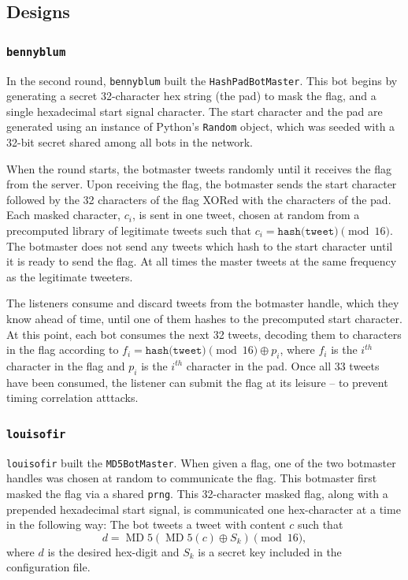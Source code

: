 \documentclass[11pt, oneside]{article} %
\numberwithin{equation}{section} %
\numberwithin{figure}{section} %
\numberwithin{table}{section} %
\renewcommand{\c}[1]{\texttt{#1}}
\newcommand{\teambb}{\c{bennyblum}}
\newcommand{\teamol}{\c{louisofir}}
\DeclareMathOperator{\MD}{MD}
\begin{document}
		
	\subsection{Designs}
		
		\subsubsection{\teambb{}}
        	In the second round, \teambb{} built the \c{HashPadBotMaster}. This bot begins by generating a secret 32-character hex string (the pad) to mask the flag, and a single hexadecimal start signal character. The start character and the pad are generated using an instance of Python's \c{Random} object, which was seeded with a 32-bit secret shared among all bots in the network.
        	
            When the round starts, the botmaster tweets randomly until it receives the flag from the server. Upon receiving the flag, the botmaster sends the start character followed by the 32 characters of the flag XORed with the characters of the pad. Each masked character, $c_i$, is sent in one tweet, chosen at random from a precomputed library of legitimate tweets such that $c_i = \c{hash(tweet)} \pmod{16}$. The botmaster does not send any tweets which hash to the start character until it is ready to send the flag. At all times the master tweets at the same frequency as the legitimate tweeters.
        	
            The listeners consume and discard tweets from the botmaster handle, which they know ahead of time, until one of them hashes to the precomputed start character. At this point, each bot consumes the next 32 tweets, decoding them to characters in the flag according to $f_i = \c{hash(tweet)} \pmod{16} \oplus p_i$, where $f_i$ is the $i^{th}$ character in the flag and $p_i$ is the $i^{th}$ character in the pad. Once all 33 tweets have been consumed, the listener can submit the flag at its leisure -- to prevent timing correlation atttacks.
		
        \subsubsection{\teamol{}}
			\teamol{} built the \c{MD5BotMaster}. When given a flag, one of the two botmaster handles was chosen at random to communicate the flag. This botmaster first masked the flag via a shared \c{prng}. This 32-character masked flag, along with a prepended hexadecimal start signal, is communicated one hex-character at a time in the following way: The bot tweets a tweet with content $c$ such that
			\[
				d=\MD5(\MD5(c)\oplus S_k) \pmod{16},
			\] 
			where $d$ is the desired hex-digit and $S_k$ is a secret key included in the configuration file.
\end{document}

